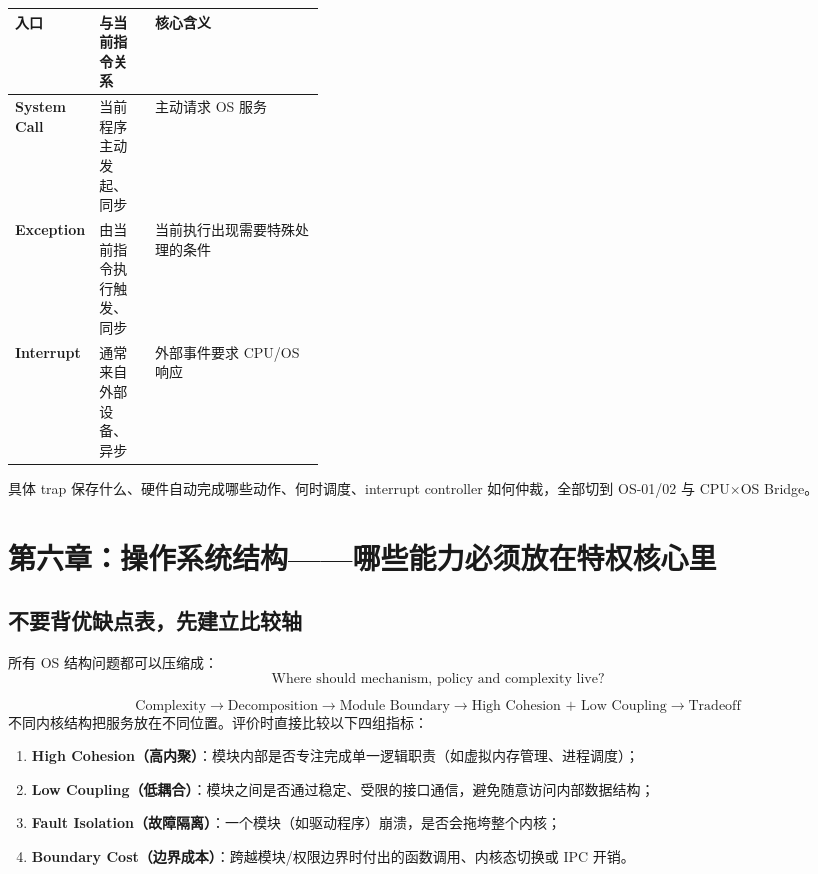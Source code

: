 \documentclass[11pt,a4paper]{ctexart}
\newcommand{\kw}[1]{\textbf{#1}}
\begin{document}
\begin{center}
\small
\renewcommand{\arraystretch}{1.25}
\begin{tabularx}{\linewidth}{>{\bfseries}p{0.18\linewidth} p{0.18\linewidth} X}
\toprule
入口 & 与当前指令关系 & 核心含义\\
\midrule
System Call & 当前程序主动发起、同步 & 主动请求 OS 服务\\
Exception & 由当前指令执行触发、同步 & 当前执行出现需要特殊处理的条件\\
Interrupt & 通常来自外部设备、异步 & 外部事件要求 CPU/OS 响应\\
\bottomrule
\end{tabularx}
\end{center}

具体 trap 保存什么、硬件自动完成哪些动作、何时调度、interrupt controller 如何仲裁，全部切到 OS-01/02 与 CPU$\times$OS Bridge。

\section{第六章：操作系统结构——哪些能力必须放在特权核心里}

\subsection{不要背优缺点表，先建立比较轴}

所有 OS 结构问题都可以压缩成：
\[
\boxed{\text{Where should mechanism, policy and complexity live?}}
\]

\begin{corebox}
\[
\boxed{
\text{Complexity}
\to
\text{Decomposition}
\to
\text{Module Boundary}
\to
\text{High Cohesion + Low Coupling}
\to
\text{Tradeoff}
}
\]
不同内核结构把服务放在不同位置。评价时直接比较以下四组指标：
\begin{enumerate}
  \item \kw{High Cohesion（高内聚）}：模块内部是否专注完成单一逻辑职责（如虚拟内存管理、进程调度）；
  \item \kw{Low Coupling（低耦合）}：模块之间是否通过稳定、受限的接口通信，避免随意访问内部数据结构；
  \item \kw{Fault Isolation（故障隔离）}：一个模块（如驱动程序）崩溃，是否会拖垮整个内核；
  \item \kw{Boundary Cost（边界成本）}：跨越模块/权限边界时付出的函数调用、内核态切换或 IPC 开销。
\end{enumerate}
\end{corebox}
\end{document}
